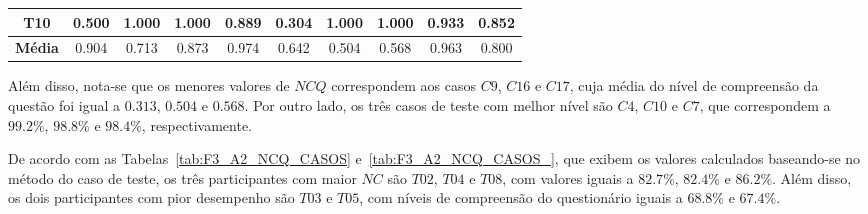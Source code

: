 \begin{table}[htbp]
\begin{tabular}{|c|cccccccc|c|}
		\rowcolor[HTML]{F2F2F2} 
		\textbf{T10}                                             & \multicolumn{1}{c|}{\cellcolor[HTML]{F2F2F2}0.500}        & \multicolumn{1}{c|}{\cellcolor[HTML]{F2F2F2}1.000}        & \multicolumn{1}{c|}{\cellcolor[HTML]{F2F2F2}1.000}        & \multicolumn{1}{c|}{\cellcolor[HTML]{F2F2F2}0.889}        & \multicolumn{1}{c|}{\cellcolor[HTML]{F2F2F2}0.304}        & \multicolumn{1}{c|}{\cellcolor[HTML]{F2F2F2}1.000}        & \multicolumn{1}{c|}{\cellcolor[HTML]{F2F2F2}1.000}        & 0.933        & 0.852                                                 \\ \hline
		\cellcolor[HTML]{F2F2F2}\textbf{Média}                     & \multicolumn{1}{c|}{0.904}                                & \multicolumn{1}{c|}{0.713}                                & \multicolumn{1}{c|}{0.873}                                & \multicolumn{1}{c|}{0.974}                                & \multicolumn{1}{c|}{0.642}                                & \multicolumn{1}{c|}{0.504}                                & \multicolumn{1}{c|}{0.568}                                & 0.963        & 0.800                                                 \\ \hline
	\end{tabular}
	\label{tab:F3_A2_NCQ_EV2_}
\end{table}

Além disso, nota-se que os menores valores de $NCQ$ correspondem aos casos $C9$, $C16$ e $C17$, cuja média do nível de compreensão da questão foi igual a $0.313$, $0.504$ e $0.568$. Por outro lado, os três casos de teste com melhor nível são $C4$, $C10$ e $C7$, que correspondem a $99.2\%$, $98.8\%$ e $98.4\%$, respectivamente.

De acordo com as Tabelas~\ref{tab:F3_A2_NCQ_CASOS} e~\ref{tab:F3_A2_NCQ_CASOS_}, que exibem os valores calculados baseando-se no método do caso de teste, os três participantes com maior $NC$ são $T02$, $T04$ e $T08$, com valores iguais a $82.7\%$, $82.4\%$ e $86.2\%$. Além disso, os dois participantes com pior desempenho são $T03$ e $T05$, com níveis de compreensão do questionário iguais a $68.8\%$ e $67.4\%$.

